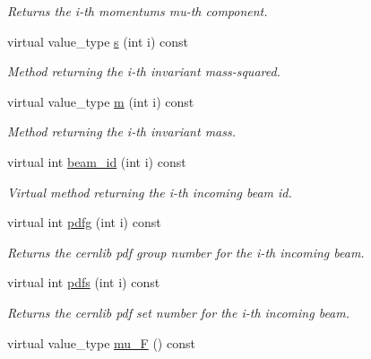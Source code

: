 \begin{DoxyCompactItemize}
\begin{DoxyCompactList}\small\item\em Returns the i-\/th momentum\textquotesingle{}s mu-\/th component. \end{DoxyCompactList}\item 
\hypertarget{a00451_a871734b21e34bf0b091362b93bf3e7d1}{}virtual value\+\_\+type \hyperlink{a00451_a871734b21e34bf0b091362b93bf3e7d1}{s} (int i) const \label{a00451_a871734b21e34bf0b091362b93bf3e7d1}

\begin{DoxyCompactList}\small\item\em Method returning the i-\/th invariant mass-\/squared. \end{DoxyCompactList}\item 
\hypertarget{a00451_abdc1d4c568e4e3b815064c3d639ad913}{}virtual value\+\_\+type \hyperlink{a00451_abdc1d4c568e4e3b815064c3d639ad913}{m} (int i) const \label{a00451_abdc1d4c568e4e3b815064c3d639ad913}

\begin{DoxyCompactList}\small\item\em Method returning the i-\/th invariant mass. \end{DoxyCompactList}\item 
\hypertarget{a00451_ab846d190acfc2bc65f2634f74c4d792c}{}virtual int \hyperlink{a00451_ab846d190acfc2bc65f2634f74c4d792c}{beam\+\_\+id} (int i) const \label{a00451_ab846d190acfc2bc65f2634f74c4d792c}

\begin{DoxyCompactList}\small\item\em Virtual method returning the i-\/th incoming beam id. \end{DoxyCompactList}\item 
\hypertarget{a00451_a8ddbafb2ee3d95eb1ba96ca48f0f9a9f}{}virtual int \hyperlink{a00451_a8ddbafb2ee3d95eb1ba96ca48f0f9a9f}{pdfg} (int i) const \label{a00451_a8ddbafb2ee3d95eb1ba96ca48f0f9a9f}

\begin{DoxyCompactList}\small\item\em Returns the cernlib pdf group number for the i-\/th incoming beam. \end{DoxyCompactList}\item 
\hypertarget{a00451_a668f0471b0ad13245705972331dcddb7}{}virtual int \hyperlink{a00451_a668f0471b0ad13245705972331dcddb7}{pdfs} (int i) const \label{a00451_a668f0471b0ad13245705972331dcddb7}

\begin{DoxyCompactList}\small\item\em Returns the cernlib pdf set number for the i-\/th incoming beam. \end{DoxyCompactList}\item 
\hypertarget{a00451_a68a37fa41c44fffb61618320b84b2879}{}virtual value\+\_\+type \hyperlink{a00451_a68a37fa41c44fffb61618320b84b2879}{mu\+\_\+\+F} () const \label{a00451_a68a37fa41c44fffb61618320b84b2879}


\end{DoxyCompactItemize}
